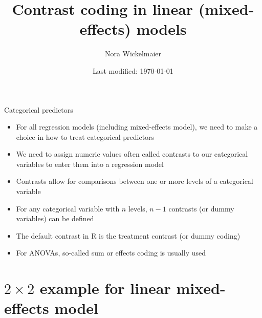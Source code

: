 \documentclass[aspectratio=169]{beamer}
\title{Contrast coding in linear (mixed-effects) models}
\author{Nora Wickelmaier}
\date{Last modified: \today}
\begin{document}
\begin{frame}{}
\thispagestyle{empty}
\titlepage
\end{frame}


\begin{frame}[<+->]{Categorical predictors}
  \begin{itemize}
    \item For all regression models (including mixed-effects model), we need to
      make a choice in how to treat categorical predictors
    \item We need to assign numeric values often called contrasts to our
      categorical variables to enter them into a regression model
    \item Contrasts allow for comparisons between one or more levels of a
      categorical variable
    \item For any categorical variable with $n$ levels, $n - 1$ contrasts (or
      dummy variables) can be defined 
    \item The default contrast in R is the treatment contrast (or dummy coding)
    \item For ANOVAs, so-called sum or effects coding is usually used
  \end{itemize}
\end{frame}

\section[$2\times 2$ example]{$2\times 2$ example for linear mixed-effects model}
\end{document}
